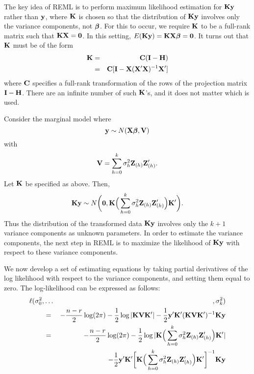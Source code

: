 The key idea of REML is to perform maximum likelihood estimation for $\mathbf{K} \mathbf{y}$ rather than $\mathbf{y}$, where $\mathbf{K}$ is chosen so that the distribution of $\mathbf{K} \mathbf{y}$ involves only the variance components, not $\mbox{\boldmath $\beta$}$. 
For this to occur, we require $\mathbf{K}$ to be a full-rank matrix such that $\mathbf{K} \mathbf{X} = \mathbf{0}$. 
In this setting, $E(\mathbf{K} \mathbf{y}) = \mathbf{K} \mathbf{X} \mbox{\boldmath $\beta$} = \mathbf{0}$. 
It turns out that $\mathbf{K}$ must be of the form 
\begin{eqnarray*}
\mathbf{K} &=& \mathbf{C} (\mathbf{I} - \mathbf{H}) \\
&=& \mathbf{C} [\mathbf{I} -  \mathbf{X}(\mathbf{X}' \mathbf{X})^{-1} \mathbf{X}']
\end{eqnarray*}
where $\mathbf{C}$ specifies a full-rank transformation of the rows of the projection matrix $\mathbf{I} -\mathbf{H}$.
There are an infinite number of such $\mathbf{K}$'s, and it does not matter which is used.

Consider the marginal model where $$\mathbf{y} \sim N(\mathbf{X} \mbox{\boldmath $\beta$}, \mathbf{V})$$ with
$$\mathbf{V}  =  \sum_{h=0}^k \sigma^2_{h} \mathbf{Z}_{(h)} \mathbf{Z}_{(h)}' .$$
Let $\mathbf{K}$ be specified as above.
Then,
$$
\mathbf{K} \mathbf{y} \sim N\bigg(\mathbf{0}, \mathbf{K} \Big(\sum_{h=0}^k \sigma^2_{h} \mathbf{Z}_{(h)} \mathbf{Z}_{(h)}' \Big) \mathbf{K}' \bigg).
$$
Thus the distribution of the transformed data $\mathbf{K} \mathbf{y}$  involves only the $k+1$ variance components as unknown parameters. 
In order to estimate the variance components, the next step in REML is to maximize the likelihood of $\mathbf{K} \mathbf{y}$ with respect to these variance components. 

We now develop a set of estimating equations by taking partial derivatives of the log likelihood with respect to the variance components, and setting them equal to zero.
The log-likelihood can be expressed as follows: 
\begin{eqnarray*}
\ell(\sigma^2_0, &\ldots& , \sigma^2_k)\\
&=&-\frac{n-r}{2}\log (2\pi) -\frac{1}{2}\log |\mathbf{K} \mathbf{V} \mathbf{K}'| -\frac{1}{2} \mathbf{y}' \mathbf{K}'(\mathbf{K} \mathbf{V} \mathbf{K}')^{-1} \mathbf{K} \mathbf{y}  \\
&=& -\frac{n-r}{2}\log (2\pi) -\frac{1}{2}\log |\mathbf{K} \Big( \sum_{h=0}^k \sigma^2_{h} \mathbf{Z}_{(h)} \mathbf{Z}_{(h)}' \Big) \mathbf{K}'| \\
& & \,\,\, -\frac{1}{2} \mathbf{y}' \mathbf{K}' \bigg[ \mathbf{K} \Big(\sum_{h=0}^k \sigma^2_{h} \mathbf{Z}_{(h)} \mathbf{Z}_{(h)}'\Big) \mathbf{K}' \bigg]^{-1} \mathbf{K} \mathbf{y}  
\end{eqnarray*}

